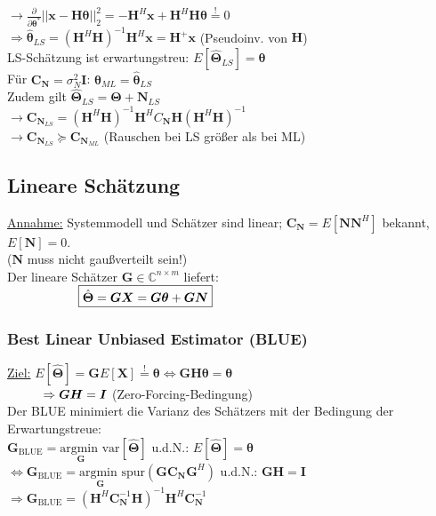 \documentclass[a4paper,landscape,6pt]{article}
\newcommand{\ma}[1]{\ensuremath{\boldsymbol {#1}}}								%
\renewcommand{\vec}[1]{\ensuremath{\boldsymbol {#1}}}							%
\newcommand{\ul}[1]{\underline{#1}}
\begin{document}
\begin{multicols}{3}
$\rightarrow \frac{\partial}{\partial \vec \theta^*}||\vec x - \ma H \vec \theta||_2^2 = -\ma H ^H \vec x + \ma H ^H \ma H \vec \theta \overset{!}{=} 0$\\

 $\Rightarrow \hat{\vec \theta}_{LS} = (\ma H^H \ma H)^{-1} \ma H^H \vec x = \ma H^+ \vec x$ (Pseudoinv. von $\ma H$)\\
 
LS-Schätzung ist erwartungstreu: $E[\hat{\vec \Theta}_{LS}] = \vec \theta$\\
Für $\ma C_{\vec N} = \sigma_N^2 \ma I$: \tab $\hat{\vec \theta}_{ML} = \hat{\vec \theta}_{LS}$\\
Zudem gilt $\hat{\vec \Theta}_{LS} = \vec \Theta + \vec N_{LS}$\\
$\rightarrow \ma C_{\vec N_{LS}} = (\ma H^H \ma H)^{-1} \ma H^H C_{\vec N} \ma H (\ma H^H \ma H)^{-1}$\\
$\rightarrow \ma C_{\vec N_{LS}} \succeq \ma C_{\vec N_{ML}}$ (Rauschen bei LS größer als bei ML)
\subsection*{Lineare Schätzung}
\ul{Annahme:} Systemmodell und Schätzer sind linear; $\ma C_{\vec N} = E[\vec N \vec N^H]$  bekannt, $E[\vec N] = 0$.\\
($\vec N$ muss nicht gaußverteilt sein!)\\

Der lineare Schätzer $\ma G \in \mathbb{C}^{n \times m}$ liefert:\\
$\tab \tab \boxed{\hat{\vec \Theta} = \ma G \ma X = \ma G \vec \theta + \ma G \vec N}$
\subsubsection*{Best Linear Unbiased Estimator (BLUE)}
\ul{Ziel:} $E[\hat{\vec \Theta}] = \ma G E[\vec X] \overset{!}{=} \vec \theta \Longleftrightarrow \ma G \ma H \vec \theta = \vec \theta$\\
$\tab \Rightarrow \ma G \ma H = \ma I$ \tab (Zero-Forcing-Bedingung)\\

Der BLUE minimiert die Varianz des Schätzers mit der Bedingung der Erwartungstreue:\\
$\ma G_{\text{BLUE}} = \underset{\ma G}{\text{argmin }} \text{var}[\hat{\vec \Theta}] $ u.d.N.: $E[\hat{\vec \Theta}] = \vec \theta $\\
$\Leftrightarrow \ma G_{\text{BLUE}} = \underset{\ma G}{\text{argmin }} \text{spur}(\ma G \ma C_{\vec N} \ma G^H)$ u.d.N.: $\ma G \ma H = \ma I$\\
\tab $\Rightarrow \boxed{ \ma G_{\text{BLUE}} = (\ma H^H\ma C_{\vec N}^{-1} \ma H)^{-1}\ma H^H \ma C_{\vec N}^{-1} }$\\


\end{multicols}
\end{document}
